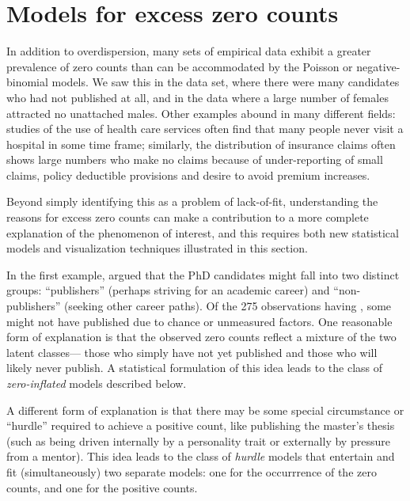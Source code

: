 \documentclass[11pt]{book}\usepackage[]{graphicx}\usepackage[]{color}
\begin{document}
\section{Models for excess zero counts}\label{sec:glm-zeros}


In addition to overdispersion, many sets of empirical data exhibit a greater prevalence of
zero counts than can be accommodated by the Poisson or negative-binomial models.
We saw this in the  data set, where there were many candidates who had
not published at all, and in the  data where a large number of
females attracted no unattached males.
Other examples abound in many different fields: studies of the 
use of health care services often find that many people never visit a hospital
in some time frame; similarly, the distribution of insurance claims often shows
large numbers who make no claims \citep{YipYau:2005} because of under-reporting
of small claims, policy deductible provisions and desire to avoid premium increases.


Beyond simply identifying this as a problem of lack-of-fit,
understanding the reasons for excess zero counts can make a contribution to a
more complete explanation of the phenomenon of interest,
and this requires both new statistical models and visualization techniques
illustrated in this section.

In the first example, \citet{Long:1997} argued that the PhD candidates might fall into
two distinct groups: ``publishers'' (perhaps striving for an academic career)
and ``non-publishers'' (seeking other career paths).  Of the 275 observations
having , some might not have published due to chance or
unmeasured factors.  One reasonable form of explanation is that the observed
zero counts reflect a mixture of the two latent classes--- those who simply
have not yet published and those who will likely never publish.
A statistical formulation of this idea leads to the class of \emph{zero-inflated}
models described below.

A different form of explanation is that there may be some special 
circumstance or ``hurdle'' required to achieve a positive count,
like publishing the master's thesis
(such as being driven internally by a personality trait or externally by
pressure from a mentor). This idea leads to the class of \emph{hurdle} models
that entertain and fit (simultaneously) two separate models: one for the
occurrrence of the zero counts, and one for the positive counts.
\end{document}
